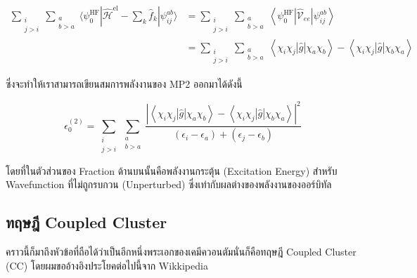 \begin{equation}
    \begin{aligned}
        \sum_{\substack{i            \\ j>i}} \sum_{\substack{a \\ b>a}}
        \langle
        \psi_{0}^{\mathrm{HF}} | \hat{\mathscr{H}}^{\mathrm{el}}
        - \sum_{k} \hat{f}_{k} | \psi_{i j}^{a b}
        \rangle &
        = \sum_{\substack{i          \\ j>i}} \sum_{\substack{a \\ b>a}}
        \left\langle
        \psi_{0}^{\mathrm{HF}}
        \left|\hat{\mathcal{V}}_{e e}\right|
        \psi_{i j}^{a b}
        \right\rangle                \\
                & =\sum_{\substack{i \\ j>i}} \sum_{\substack{a \\ b>a}}
        \left\langle
        \chi_{i} \chi_{j}|\hat{g}| \chi_{a} \chi_{b}
        \right\rangle
        - \left\langle
        \chi_{i} \chi_{j}|\hat{g}| \chi_{b} \chi_{a}
        \right\rangle
    \end{aligned}
\end{equation}

\noindent ซึ่งจะทำให้เราสามารถเขียนสมการพลังงานของ MP2 ออกมาได้ดังนี้

\begin{equation}
    \epsilon^{(2)}_{0}
    =
    \sum_{\substack{i \\ j>i}} \sum_{\substack{a \\ b>a}}
    \frac
    {
    \left| \left\langle \chi_{i}\chi_{j} | \hat{g} | \chi_{a}\chi_{b} \right\rangle
    - \left\langle \chi_{i}\chi_{j} | \hat{g} | \chi_{b}\chi_{a} \right\rangle \right|^{2}
    }
    {
    (\epsilon_{i} - \epsilon_{a}) + (\epsilon_{j} - \epsilon_{b})
    }
\end{equation}

\noindent โดยที่ในตัวส่วนของ Fraction ด้านบนนั้นคือพลังงานกระตุ้น (Excitation Energy) สำหรับ Wavefunction ที่ไม่ถูกรบกวน
(Unperturbed) ซึ่งเท่ากับผลต่างของพลังงานของออร์บิทัล

\subsection{ทฤษฎี Coupled Cluster}

คราวนี้ก็มาถึงหัวข้อที่ถือได้ว่าเป็นอีกหนึ่งพระเอกของเคมีควอนตัมนั่นก็คือทฤษฎี Coupled Cluster (CC) โดยผมขออ้างอิงประโยคต่อไปนี้จาก Wikkipedia

